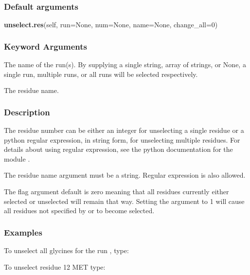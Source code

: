 \subsubsection{Default arguments}

\textsf{\textbf{unselect.res}(self, run=None, num=None, name=None, change\_all=0)}


\subsubsection{Keyword Arguments}

  The name of the run(s).  By supplying a single string, array of strings, or None, a single run, multiple runs, or all runs will be selected respectively.

  The residue name.


\subsubsection{Description}

The residue number can be either an integer for unselecting a single residue or a python
regular expression, in string form, for unselecting multiple residues.  For details about
using regular expression, see the python documentation for the module 
.

The residue name argument must be a string.  Regular expression is also allowed.

The 
 flag argument default is zero meaning that all residues currently either
selected or unselected will remain that way.  Setting the argument to 1 will cause all
residues not specified by 
 or 
 to become selected.


\subsubsection{Examples}

To unselect all glycines for the run 
, type:




To unselect residue 12 MET type:



